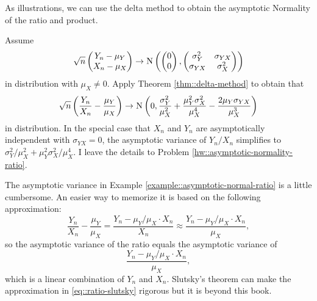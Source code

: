 As illustrations, we can use the delta method to obtain the asymptotic Normality of the ratio and product. 

\begin{example}
\label{example::asymptotic-normal-ratio}
Assume 
\begin{equation}\label{eq::normal-ratio}
\sqrt{n} \begin{pmatrix}
Y_n - \mu_Y \\
X_n - \mu_X
\end{pmatrix}
\rightarrow 
\textsc{N}\left(
\begin{pmatrix}
0\\
0
\end{pmatrix},
\begin{pmatrix}
\sigma_Y^2 & \sigma_{YX} \\
 \sigma_{YX} &  \sigma_X^2 
\end{pmatrix}
\right)
\end{equation}
in distribution with $\mu_X \neq 0.$ Apply Theorem \ref{thm::delta-method} to obtain that
\begin{equation}\label{eq::ratio-normality}
\sqrt{n} \left(   \frac{Y_n}{X_n}  -  \frac{\mu_Y}{\mu_X} \right)
\rightarrow
\textsc{N}\left(0,    \frac{  \sigma_Y^2 }{ \mu_X^2 }  + \frac{ \mu_Y^2 \sigma_X^2}{ \mu_X^4}  - \frac{2\mu_Y \sigma_{YX}}{\mu_X^3} \right)
\end{equation}
in distribution. 
In the special case that $X_n$ and $Y_n$ are asymptotically independent with $\sigma_{YX} = 0$, the asymptotic variance of $Y_n/X_n$ simplifies to $\sigma_Y^2 / \mu_X^2 + \mu_Y^2 \sigma_X^2 / \mu_X^4$.
I leave the details to Problem \ref{hw::asymptotic-normality-ratio}.
\end{example}


The asymptotic variance in Example \ref{example::asymptotic-normal-ratio} is a little cumbersome. An easier way to memorize it is based on the following approximation:
\begin{equation}\label{eq::ratio-slutsky}
\frac{Y_n}{X_n}  -  \frac{\mu_Y}{\mu_X}  = \frac{Y_n -  \mu_Y/\mu_X \cdot X_n  }{X_n} \approx   \frac{Y_n -  \mu_Y/\mu_X \cdot X_n  }{\mu_X}, 
\end{equation}
so the asymptotic variance of the ratio equals the asymptotic variance of 
$$
 \frac{Y_n -  \mu_Y/\mu_X \cdot X_n  }{\mu_X},
 $$
which is a linear combination of $Y_n$ and $X_n$. Slutsky's theorem can make the approximation in \eqref{eq::ratio-slutsky} rigorous but it is beyond this book. 


